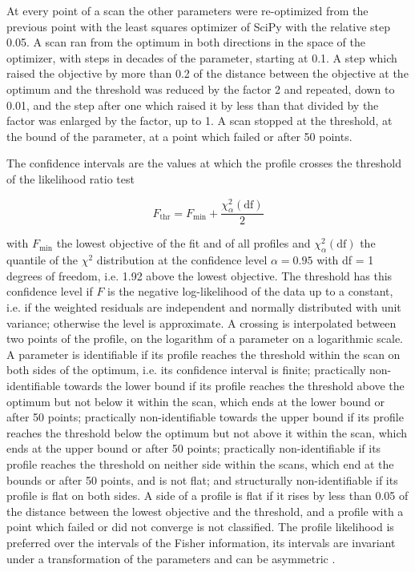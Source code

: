 At every point of a scan the other parameters were re-optimized from the previous point with the least squares optimizer of SciPy with the relative step 0.05. A scan ran from the optimum in both directions in the space of the optimizer, with steps in decades of the parameter, starting at 0.1. A step which raised the objective by more than 0.2 of the distance between the objective at the optimum and the threshold was reduced by the factor 2 and repeated, down to 0.01, and the step after one which raised it by less than that divided by the factor was enlarged by the factor, up to 1. A scan stopped at the threshold, at the bound of the parameter, at a point which failed or after 50 points.

The confidence intervals are the values at which the profile crosses the threshold of the likelihood ratio test

\begin{equation}
F_{\mathrm{thr}} = F_{\min} + \frac{\chi^2_{\alpha}(\mathrm{df})}{2}
\end{equation}

with $F_{\min}$ the lowest objective of the fit and of all profiles and $\chi^2_{\alpha}(\mathrm{df})$ the quantile of the $\chi^2$ distribution at the confidence level $\alpha = 0.95$ with df = 1 degrees of freedom, i.e. 1.92 above the lowest objective. The threshold has this confidence level if $F$ is the negative log-likelihood of the data up to a constant, i.e. if the weighted residuals are independent and normally distributed with unit variance; otherwise the level is approximate. A crossing is interpolated between two points of the profile, on the logarithm of a parameter on a logarithmic scale. A parameter is identifiable if its profile reaches the threshold within the scan on both sides of the optimum, i.e. its confidence interval is finite; practically non-identifiable towards the lower bound if its profile reaches the threshold above the optimum but not below it within the scan, which ends at the lower bound or after 50 points; practically non-identifiable towards the upper bound if its profile reaches the threshold below the optimum but not above it within the scan, which ends at the upper bound or after 50 points; practically non-identifiable if its profile reaches the threshold on neither side within the scans, which end at the bounds or after 50 points, and is not flat; and structurally non-identifiable if its profile is flat on both sides. A side of a profile is flat if it rises by less than 0.05 of the distance between the lowest objective and the threshold, and a profile with a point which failed or did not converge is not classified. The profile likelihood is preferred over the intervals of the Fisher information, its intervals are invariant under a transformation of the parameters and can be asymmetric \cite{Wieland2021}.

